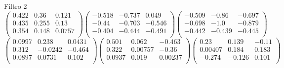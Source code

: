 Filtro 2
{ \small
\[
\begin{pmatrix}
  0.422 & 0.36 & 0.121 \\
  0.435 & 0.255 & 0.13 \\
  0.354 & 0.148 & 0.0757 \\
\end{pmatrix}
\begin{pmatrix}
  -0.518 & -0.737 & 0.049 \\
  -0.44 & -0.703 & -0.546 \\
  -0.404 & -0.444 & -0.491 \\
\end{pmatrix}
\begin{pmatrix}
  -0.509 & -0.86 & -0.697 \\
  -0.698 & -1.0 & -0.879 \\
  -0.442 & -0.439 & -0.445 \\
\end{pmatrix}
\]
\[
\begin{pmatrix}
  0.0997 & 0.238 & 0.0431 \\
  0.312 & -0.0242 & -0.464 \\
  0.0897 & 0.0731 & 0.102 \\
\end{pmatrix}
\begin{pmatrix}
  0.501 & 0.062 & -0.463 \\
  0.322 & 0.00757 & -0.36 \\
  0.0937 & 0.019 & 0.00237 \\
\end{pmatrix}
\begin{pmatrix}
  0.23 & 0.139 & -0.11 \\
  0.00407 & 0.184 & 0.183 \\
  -0.274 & -0.126 & 0.101 \\
\end{pmatrix}
\]
}

